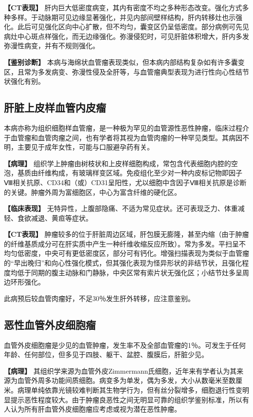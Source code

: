 \textbf{【CT表现】}
肝内巨大低密度病变，其内有密度不均之多种形态改变。强化方式多种多样。于动脉期可见边缘显著强化，并见内部间壁样结构，肝内转移灶也示强化。此后可见强化区向中心扩散，但不均匀，囊变区仍呈低密度。部分病例可先见病灶中心斑点样强化，而无边缘强化。弥漫侵犯时，可见肝脏体积增大，肝内多发弥漫性病变，并有不规则强化。

\textbf{【鉴别诊断】}
本病与海绵状血管瘤表现类似，但本病内部结构复杂如有许多囊变区，且常为多发病变、弥漫性侵及全肝等，与血管瘤典型表现为进行性向心性结节状强化有别。

\subsection{肝脏上皮样血管内皮瘤}

本病亦称为组织细胞样血管瘤，是一种极为罕见的血管源性恶性肿瘤，临床过程介于血管瘤和血管肉瘤之间，也有学者将其视为血管肉瘤的一种罕见类型。其病因不明，主要见于成年女性，可能与口服避孕药有关。

\textbf{【病理】}
组织学上肿瘤由树枝状和上皮样细胞构成，常包含代表细胞内腔的空泡，基质由纤维构成，有玻璃样变区域。免疫组化至少对一种内皮标记物即因子Ⅷ相关抗原、CD34和（或）CD31呈阳性，尤以细胞中含因子Ⅷ相关抗原是诊断的关键。肿瘤外周为富细胞区，中心为富含纤维的硬化区。

\textbf{【临床表现】}
无特异性，上腹部隐痛、不适为常见症状。还可表现乏力、体重减轻、食欲减退、黄疸等症状。

\textbf{【CT表现】}
肿瘤较多的位于肝脏周边区域，肝包膜无膨隆，甚至内缩（由于肿瘤的纤维基质成分可在肝实质中产生一种纤维收缩反应所致）。常为多发。平扫呈不均匀低密度，中央可有更低密度区，部分可有钙化。增强扫描表现为类似于血管瘤的“早出晚归”和向心性强化模式，但其强化表现为怪异形状的非结节状，且强化程度均低于同期的腹主动脉和门静脉，中央区常有索片状无强化区；小结节灶多呈周边环形强化。

此病预后较血管肉瘤好，不足30％发生肝外转移，应注意鉴别。

\subsection{恶性血管外皮细胞瘤}

血管外皮细胞瘤是少见的血管肿瘤，发生率不及全部血管瘤的1％。可发生于任何年龄、任何部位，但多见于四肢、躯干、盆腔、腹膜后，肝脏少见。

\textbf{【病理】}
其组织学来源为血管外皮Zimmermann氏细胞，近年来有学者认为其来源为血管外周多功能间质细胞。病变多为单发，偶为多发，大小从数毫米至数厘米。病理单纯依靠光镜较难判断其生物学行为，但有丝分裂增多，细胞退行性变明显提示恶性程度较大。由于肿瘤良恶性之间无明显可靠的组织学鉴别标准，所以有人认为所有肝血管外皮细胞瘤应考虑或视为潜在恶性肿瘤。

